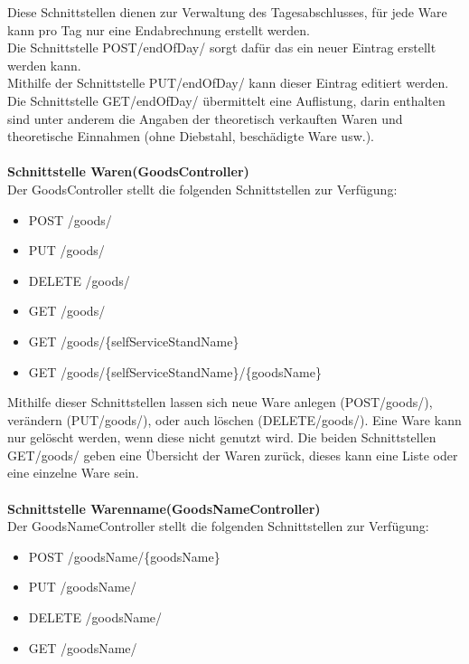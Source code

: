 Diese Schnittstellen dienen zur Verwaltung des Tagesabschlusses, für jede Ware kann pro Tag nur eine Endabrechnung erstellt werden.\\
Die Schnittstelle POST/endOfDay/ sorgt dafür das ein neuer Eintrag erstellt werden kann.
\\
Mithilfe der Schnittstelle PUT/endOfDay/ kann dieser Eintrag editiert werden.\\
Die Schnittstelle GET/endOfDay/ übermittelt eine Auflistung, darin enthalten sind unter anderem die Angaben der theoretisch verkauften Waren und theoretische Einnahmen (ohne Diebstahl, beschädigte Ware usw.). 
\\
\\
\textbf{Schnittstelle Waren(GoodsController)}
\\
Der GoodsController stellt die folgenden Schnittstellen zur Verfügung:

\begin{itemize}
	\itemsep0pt
	\item  POST /goods/
	\item  PUT /goods/
	\item  DELETE /goods/
	\item  GET /goods/
	\item  GET /goods/\{selfServiceStandName\}
	\item  GET /goods/\{selfServiceStandName\}/\{goodsName\}
\end{itemize}

Mithilfe dieser Schnittstellen lassen sich neue Ware anlegen (POST/goods/), verändern (PUT/goods/), oder auch löschen (DELETE/goods/). Eine Ware kann nur gelöscht werden, wenn diese nicht genutzt wird. Die beiden Schnittstellen GET/goods/ geben eine Übersicht der Waren zurück, dieses kann eine Liste oder eine einzelne Ware sein.
\\
\\
\textbf{Schnittstelle Warenname(GoodsNameController)}
\\
Der GoodsNameController stellt die folgenden Schnittstellen zur Verfügung:

\begin{itemize}
	\itemsep0pt
	\item  POST /goodsName/\{goodsName\}
	\item  PUT /goodsName/
	\item  DELETE /goodsName/
	\item  GET /goodsName/
	
\end{itemize}

